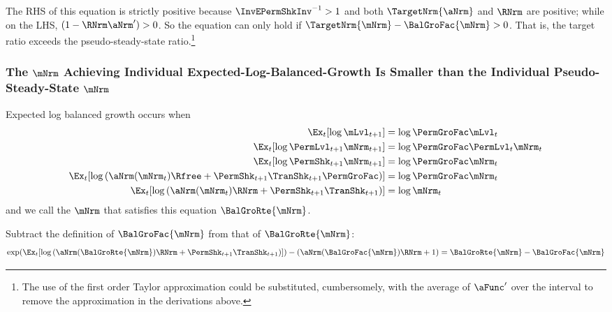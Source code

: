 \documentclass[\econtexRoot/BufferStockTheory]{subfiles}
\begin{document}
The RHS of this equation is strictly positive because $\InvEPermShkInv^{-1}>1$ and both $\TargetNrm{\aNrm}$ and $\RNrm$ are positive; while on the LHS, $(1-\RNrm\aNrm^{\prime})>0$.  So the equation can only hold if $\TargetNrm{\mNrm}-\BalGroFac{\mNrm} > 0$.  That is, the target ratio exceeds the pseudo-steady-state ratio.\footnote{The use of the first order Taylor approximation could be substituted, cumbersomely, with the average of $\aFunc^{\prime}$ over the interval to remove the approximation in the derivations above.}

\subsubsection{The \texorpdfstring{$\mNrm$}{m}  Achieving Individual Expected-Log-Balanced-Growth Is Smaller than the Individual Pseudo-Steady-State \texorpdfstring{$\mNrm$}{m}}

Expected log balanced growth occurs when
\begin{equation}\begin{split}
    \Ex_{t}[\log \mLvl_{t+1}] & = \log \PermGroFac \mLvl_{t}
\\      \Ex_{t}[\log \PermLvl_{t+1}\mNrm_{t+1}] & = \log \PermGroFac \PermLvl_{t} \mNrm_{t}
\\      \Ex_{t}[\log \PermShk_{t+1}\mNrm_{t+1}] & = \log \PermGroFac \mNrm_{t}
\\      \Ex_{t}[\log \left(\aNrm(\mNrm_{t})\Rfree+\PermShk_{t+1}\TranShk_{t+1}\PermGroFac\right)] & = \log \PermGroFac \mNrm_{t}
\\      \Ex_{t}[\log \left(\aNrm(\mNrm_{t})\RNrm+\PermShk_{t+1}\TranShk_{t+1}\right)] & = \log \mNrm_{t}
\end{split}\end{equation}
and we call the $\mNrm$ that satisfies this equation $\BalGroRte{\mNrm}$.

Subtract the definition of $\BalGroFac{\mNrm}$ from that of $\BalGroRte{\mNrm}$:
\begin{equation}\begin{split}
    \exp(\Ex_{t}[\log \left(\aNrm(\BalGroRte{\mNrm})\RNrm+\PermShk_{t+1}\TranShk_{t+1}\right)]) - (\aNrm(\BalGroFac{\mNrm})\RNrm+1 ) = \BalGroRte{\mNrm} - \BalGroFac{\mNrm}
\end{split}\end{equation}
\end{document}
